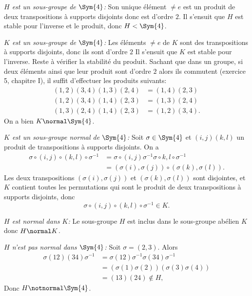 \emph{$H$ est un sous-groupe de $\Sym{4}$:} 
Son unique élément $\neq e$ est un produit de deux transpositions à supports
disjoints donc est d'ordre $2$. Il s'ensuit que $H$ est stable pour l'inverse et
le produit, donc $H<\Sym{4}$.

\emph{$K$ est un sous-groupe de $\Sym{4}$:}
Les éléments $\neq e$ de $K$ sont des transpositions à supports disjoints, donc
ils sont d'ordre $2$ Il s'ensuit que $K$ est stable pour l'inverse. Reste à
vérifier la stabilité du produit. Sachant que dans un groupe, si deux éléments
ainsi que leur produit sont d'ordre $2$ alors ils commutent (exercice 5,
chapitre I), il suffit
d'effectuer les produits suivants:
%
\begin{align*}
  (1,2)(3,4)(1,3)(2,4) &= (1,4)(2,3) \\
  (1,2)(3,4)(1,4)(2,3) &= (1,3)(2,4) \\
  (1,3)(2,4)(1,4)(2,3) &= (1,2)(3,4).
\end{align*}
%
On a bien $K\normal\Sym{4}$.

\emph{$K$ est un sous-groupe normal de $\Sym{4}$:}
Soit $\sigma\in\Sym{4}$ et $(i,j)(k,l)$ un produit de transpositions à supports
disjoints. On a
%
\begin{align*}
  \sigma\circ(i,j)\circ(k,l)\circ\sigma^{-1}
  &= \sigma\circ(i,j)\sigma^{-1}\sigma\circ{k,l}\circ\sigma^{-1} \\
  &= (\sigma(i),\sigma(j))\circ(\sigma(k),\sigma(l)).
\end{align*}
%
Les deux transpositions $(\sigma(i),\sigma(j))$ et $(\sigma(k),\sigma(l))$ sont
disjointes, et $K$ contient toutes les permutations qui sont le produit de deux
transpositions à supports disjoints, donc
\[
  \sigma\circ(i,j)\circ(k,l)\circ\sigma^{-1}\in K.
\]

\emph{$H$ est normal dans $K$:}
Le sous-groupe $H$ est inclus dans le sous-groupe abélien $K$ donc $H\normal K$.

\emph{$H$ n'est pas normal dans $\Sym{4}$:}
%
Soit $\sigma = (2,3)$. Alors
%
\begin{align*}
  \sigma(12)(34)\sigma^{-1} 
  &= \sigma(12)\sigma^{-1}\sigma(34)\sigma^{-1} \\
  &= (\sigma(1)\sigma(2))(\sigma(3)\sigma(4))  \\
  &= (13)(24)\notin H,
\end{align*}
%
Donc $H\notnormal\Sym{4}$.

